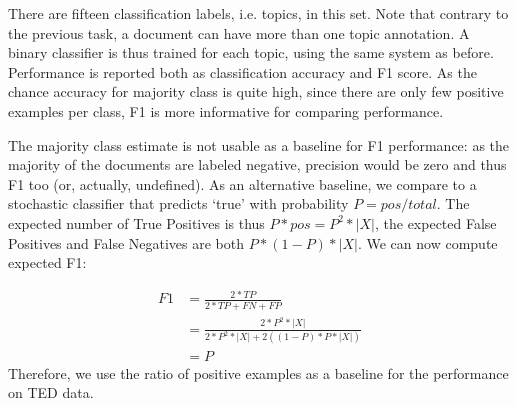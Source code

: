 There are fifteen classification labels, i.e. topics, in this set.
Note that contrary to the previous task, a document can have more than one topic annotation. A binary classifier is thus trained for each topic, using the same system as before. Performance is reported both as classification accuracy and F1 score. As the chance accuracy for majority class is quite high, since there are only few positive examples per class, F1 is more informative for comparing performance. 

The majority class estimate is not usable as a baseline for F1 performance: as the majority of the documents are labeled negative, precision would be zero and thus F1 too (or, actually, undefined). As an alternative baseline, we compare to a stochastic classifier that predicts `true' with probability $P=pos/total$. The expected number of True Positives is thus $P*pos=P^2*|X|$, the expected False Positives and False Negatives are both $P*(1-P)*|X|$. We can now compute expected F1:

\begin{align*}
F1	&=\frac{2*TP}{2*TP+FN+FP}\\
			&=\frac{2*P^2*|X|}{2*P^2*|X|+2((1-P)*P*|X|)}\\
			&=P
\end{align*} Therefore, we use the ratio of positive examples as a baseline for the performance on TED data.







